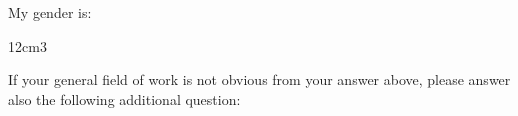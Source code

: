 \begin{checkboxQuestionsCompact}{\parbox[c][7.5mm]{\textwidth}{My gender is:}}{12cm}{3}
\end{checkboxQuestionsCompact}
If your general field of work is not obvious from your answer above, please answer also the following additional question: \\
